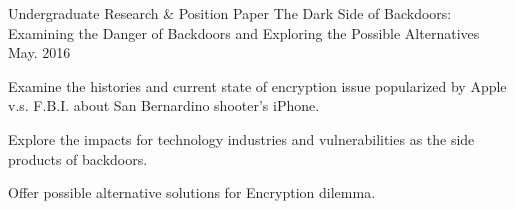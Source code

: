 

\begin{cventries}

  \cventry
    {Undergraduate Research \& Position Paper} %
    {The Dark Side of Backdoors: Examining the Danger of Backdoors and Exploring the Possible Alternatives} %
    {} %
    {May. 2016} %
    {
      \begin{cvitems} %
        \item {Examine the histories and current state of encryption issue popularized by Apple v.s. F.B.I. about San Bernardino shooter's iPhone. }
        \item {Explore the impacts for technology industries and vulnerabilities as the side products of backdoors. }
        \item {Offer possible alternative solutions for Encryption dilemma. }
      \end{cvitems}
    }
\end{cventries}
